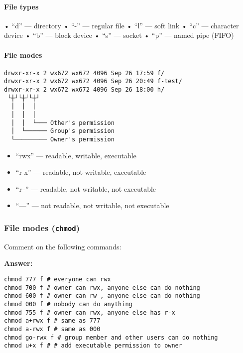 \documentclass{swfucoursework}
\begin{document}
\paragraph{File types}\label{file-types}

• ``d'' --- directory • ``-'' --- regular file • ``l'' --- soft link •
``c'' --- character device • ``b'' --- block device • ``s'' --- socket •
``p'' --- named pipe (FIFO)

\paragraph{File modes}\label{file-modes}

\begin{verbatim}
drwxr-xr-x 2 wx672 wx672 4096 Sep 26 17:59 f/
drwxr-xr-x 2 wx672 wx672 4096 Sep 26 20:49 f-test/
drwxr-xr-x 2 wx672 wx672 4096 Sep 26 18:00 h/
 └┼┘└┼┘└┼┘
  │  │  │
  │  │  │
  │  │  └─── Other's permission
  │  └────── Group's permission
  └───────── Owner's permission
\end{verbatim}

\begin{itemize}
\tightlist
\item
  ``rwx'' --- readable, writable, executable
\item
  ``r-x'' --- readable, not writable, executable
\item
  ``r--'' --- readable, not writable, not executable
\item
  ``---'' --- not readable, not writable, not executable
\end{itemize}

\subsubsection{\texorpdfstring{File modes
(\texttt{chmod})}{File modes ()}}\label{file-modes-chmod}

Comment on the following commands:

\textbf{Answer:}

\begin{verbatim}
chmod 777 f # everyone can rwx
chmod 700 f # owner can rwx, anyone else can do nothing
chmod 600 f # owner can rw-, anyone else can do nothing
chmod 000 f # nobody can do anything
chmod 755 f # owner can rwx, anyone else has r-x
chmod a+rwx f # same as 777
chmod a-rwx f # same as 000
chmod go-rwx f # group member and other users can do nothing
chmod u+x f # # add executable permission to owner
\end{verbatim}
\end{document}
